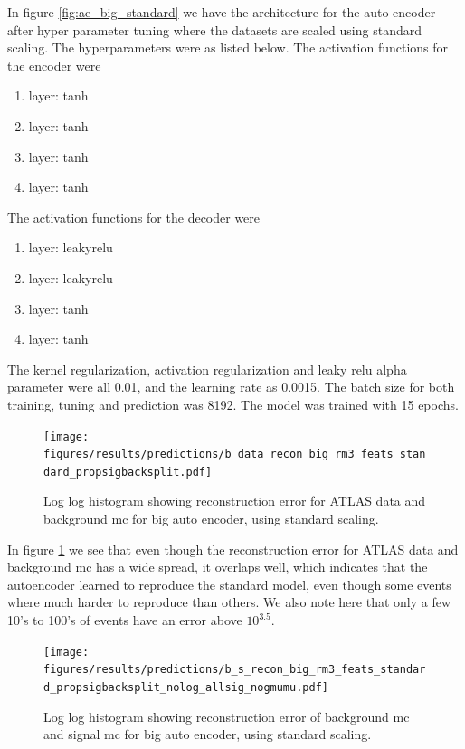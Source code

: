 \documentclass[ reprint, amsmath,amssymb, aps, nofootinbib]{revtex4-2}
\begin{document}
In figure \ref{fig:ae_big_standard} we have the architecture for the auto encoder after hyper parameter tuning where the datasets are scaled using standard scaling. The hyperparameters were as listed below. 
The activation functions for the encoder were
\begin{enumerate}
    \item layer: tanh
    \item layer: tanh
    \item layer: tanh
    \item layer: tanh
\end{enumerate}
The activation functions for the decoder were 
\begin{enumerate}
    \item layer: leakyrelu
    \item layer: leakyrelu
    \item layer: tanh
    \item layer: tanh
\end{enumerate}

The kernel regularization, activation regularization and leaky relu alpha parameter were all 0.01, and the learning rate as 0.0015. The batch size for both training, tuning and prediction was 8192. The model was trained with 15 epochs.

\begin{figure}[H]
     \centering
         \texttt{[image: figures/results/predictions/b\_data\_recon\_big\_rm3\_feats\_standard\_propsigbacksplit.pdf]}
         \caption{Log log histogram showing reconstruction error for ATLAS data and background mc for big auto encoder, using standard scaling.}
     \label{fig:data_b_big_pred_stand}
\end{figure}


In figure \ref{fig:data_b_big_pred_stand} we see that even though the reconstruction error for ATLAS data and background mc has a wide spread, it overlaps well, which indicates that the autoencoder learned to reproduce the standard model, even though some events where much harder to reproduce than others. We also note here that only a few 10's to 100's of events have an error above $10^{3.5}$. 

\begin{figure}[H]
    \centering
    \texttt{[image: figures/results/predictions/b\_s\_recon\_big\_rm3\_feats\_standard\_propsigbacksplit\_nolog\_allsig\_nogmumu.pdf]}
    \caption{Log log histogram showing reconstruction error of background mc and signal mc for big auto encoder, using standard scaling. }
    \label{fig:s_b_big_pred_stand}
\end{figure}
\end{document}
